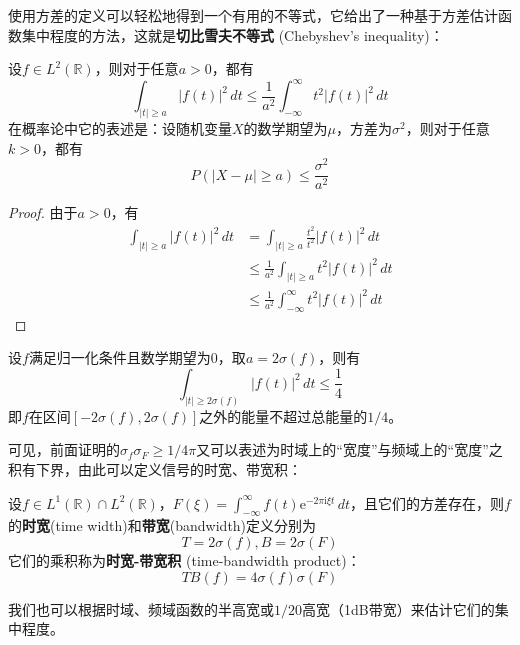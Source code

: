 \documentclass{ctexbook}
\begin{document}
使用方差的定义可以轻松地得到一个有用的不等式，它给出了一种基于方差估计函数集中程度的方法，这就是\textbf{切比雪夫不等式} (Chebyshev's inequality)：
\begin{theorem}[切比雪夫不等式]
    设$f\in L^2(\mathbb{R} )$，则对于任意$a>0$，都有
    \[\int_{|t|\geq a}|f(t)|^2\,dt\leq \frac{1}{a^2}\int_{-\infty}^{\infty}t^2|f(t)|^2\,dt\]
    在概率论中它的表述是：设随机变量$X$的数学期望为$\mu$，方差为$\sigma^2$，则对于任意$k>0$，都有\[P(|X-\mu|\geq a)\leq \frac{\sigma^2}{a^2}\]
\end{theorem}
\begin{proof}
    由于$a>0$，有
    \begin{align*}
    \int_{|t|\geq a}|f(t)|^2\,dt&=\int_{|t|\geq a}\frac{t^2}{t^2}|f(t)|^2\,dt\\
    &\leq \frac{1}{a^2}\int_{|t|\geq a}t^2|f(t)|^2\,dt\\
    &\leq \frac{1}{a^2}\int_{-\infty}^{\infty}t^2|f(t)|^2\,dt
\end{align*}
\end{proof}

\begin{example}
    设$f$满足归一化条件且数学期望为0，取$a=2\sigma(f)$，则有\[\int_{|t|\geq 2\sigma(f)}|f(t)|^2\,dt\leq \frac{1}{4}\]
即$f$在区间$[-2\sigma(f),2\sigma(f)]$之外的能量不超过总能量的$1/4$。
\end{example}
可见，前面证明的$\sigma_f \sigma_F\geq 1/4\pi$又可以表述为时域上的“宽度”与频域上的“宽度”之积有下界，由此可以定义信号的时宽、带宽积：
\begin{definition}[时宽-带宽积]
    设$f\in L^1(\mathbb{R} )\cap L^2(\mathbb{R} )$，$F(\xi)=\int_{-\infty}^{\infty}f(t)\mathrm{e}^{-2\pi \mathrm{i}\xi t}\,dt$，且它们的方差存在，则$f$的\textbf{时宽}(time width)和\textbf{带宽}(bandwidth)定义分别为
    \[T=2\sigma(f),B=2\sigma(F)\]
    它们的乘积称为\textbf{时宽-带宽积} (time-bandwidth product)：
    \[TB(f)=4\sigma(f)\sigma(F)\]
\end{definition}

我们也可以根据时域、频域函数的半高宽或$1/20$高宽（1dB带宽）来估计它们的集中程度。
\end{document}
